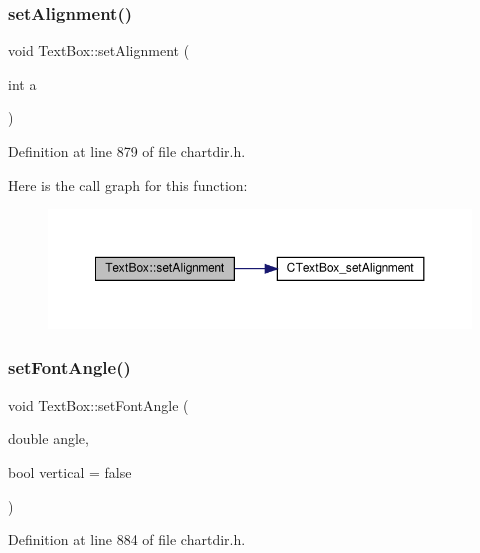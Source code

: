 \subsubsection{\texorpdfstring{set\+Alignment()}{setAlignment()}}
{\footnotesize\ttfamily void Text\+Box\+::set\+Alignment (\begin{DoxyParamCaption}\item[{int}]{a }\end{DoxyParamCaption})\hspace{0.3cm}{\ttfamily [inline]}}



Definition at line 879 of file chartdir.\+h.

Here is the call graph for this function\+:
\nopagebreak
\begin{figure}[H]
\begin{center}
\leavevmode
\includegraphics[width=350pt]{class_text_box_ab5afee7f63b0c165717bfc28d050262f_cgraph}
\end{center}
\end{figure}
\mbox{\label{class_text_box_a30feafdb422cdad2c53a3dc63a1f8d91}} 
\subsubsection{\texorpdfstring{set\+Font\+Angle()}{setFontAngle()}}
{\footnotesize\ttfamily void Text\+Box\+::set\+Font\+Angle (\begin{DoxyParamCaption}\item[{double}]{angle,  }\item[{bool}]{vertical = {\ttfamily false} }\end{DoxyParamCaption})\hspace{0.3cm}{\ttfamily [inline]}}



Definition at line 884 of file chartdir.\+h.

